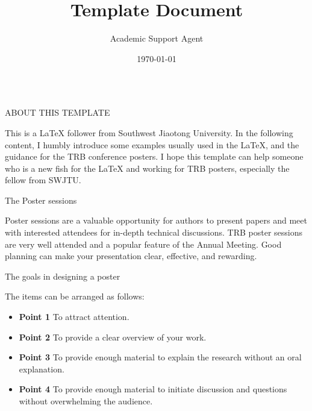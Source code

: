\documentclass{article}
\title{Template Document}
\author{Academic Support Agent}
\date{\today}
\begin{document}
\maketitle

\begin{frame}[t]
\begin{columns}[t]
\separatorcolumn

\begin{column}{\colwidth}

\begin{block}{ABOUT THIS TEMPLATE}

    This is a LaTeX follower from Southwest Jiaotong University.
    In the following content, I humbly introduce some examples usually used in the LaTeX, and the guidance for the TRB conference posters.
    I hope this template can help someone who is a new fish for the LaTeX and working for TRB posters, especially the fellow from SWJTU.

  \end{block}
  
  \begin{block}{The Poster sessions}

    Poster sessions are a valuable opportunity for authors to present papers and meet with interested attendees for in-depth technical discussions. TRB poster sessions are very well attended and a popular feature of the Annual Meeting. Good planning can make your presentation clear, effective, and rewarding.

  \end{block}

  \begin{block}{The goals in designing a poster}

    The items can be arranged as follows: 
    
    \begin{itemize}
      \item \textbf{Point 1} To attract attention.
      \item \textbf{Point 2} To provide a clear overview of your work.
      \item \textbf{Point 3} To provide enough material to explain the research without an oral explanation.
      \item \textbf{Point 4} To provide enough material to initiate discussion and questions without overwhelming the audience.
    \end{itemize}


  \end{block}


\end{column}
\end{columns}
\end{frame}
\end{document}
